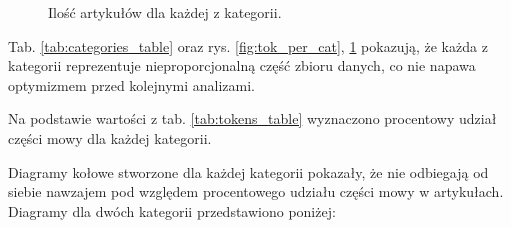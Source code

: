 \documentclass{article}
\begin{document}
\begin{figure}[H]
    \begin{center}
        \caption{Ilość artykułów dla każdej z kategorii.}
        \label{fig:files_per_cat}
    \end{center}
\end{figure}

Tab. \ref{tab:categories_table} oraz rys. \ref{fig:tok_per_cat}, \ref{fig:files_per_cat} pokazują,
że każda z kategorii reprezentuje nieproporcjonalną część zbioru danych, co nie napawa optymizmem
przed kolejnymi analizami.

Na podstawie wartości z tab. \ref{tab:tokens_table} wyznaczono procentowy udział części mowy
dla każdej kategorii.



Diagramy kołowe stworzone dla każdej kategorii pokazały, że nie odbiegają od siebie nawzajem pod względem
procentowego udziału części mowy w artykułach. Diagramy dla dwóch kategorii przedstawiono poniżej:
\end{document}
